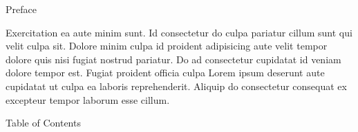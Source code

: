 


\vspace{\mktsLineheight}\begin{multicols}{2}\raggedcolumns{}

\end{multicols}


{\mktsHTwo{}Preface\mktsHTwoBeg}%


\vspace{\mktsLineheight}\begin{multicols}{2}\raggedcolumns{}Exercitation ea aute minim sunt. Id consectetur do culpa pariatur cillum sunt qui velit culpa sit. Dolore minim culpa id proident adipisicing aute velit tempor dolore quis nisi fugiat nostrud pariatur. Do ad consectetur cupidatat id veniam dolore tempor est. Fugiat proident officia culpa Lorem ipsum deserunt aute cupidatat ut culpa ea laboris reprehenderit. Aliquip do consectetur consequat ex excepteur tempor laborum esse cillum.




\end{multicols}

\mktsRuleSwell{}

\vspace{\mktsLineheight}\begin{multicols}{2}\raggedcolumns{}

\end{multicols}


{\mktsHTwo{}Table of Contents\mktsHTwoBeg}%


\vspace{\mktsLineheight}\begin{multicols}{2}%

\end{multicols}

